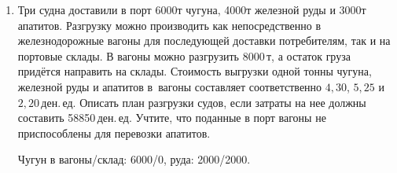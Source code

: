 \documentclass[a5paper,11pt]{extarticle}
\begin{document}
\begin{enumerate}
Найти количество сырья, которое следует переработать по каждой технологии, чтобы произвести 574~изделия~$A$ и~328~изделий~$B$ из 94\;ед. сырья.

{\raggedleft
\underline{$
(x_1,x_2,x_3,x_4) = (-\frac{12}{13} a, 14 + \frac{7}{26}a, 80 - \frac{9}{26} a, a)
$}

$
	\left\lbrace
	\begin{aligned}
		x_1 + x_2 + x_3 + x_4 &= 94,\\
		2x_1 + x_2 + 7x_3 + 4x_4 &= 574,\\
		6x_1 +12x_2 +2x_3 + 3x_4 &= 328.\\
	\end{aligned}
	\right.
$
\par}

\item 
	Три судна доставили в порт 6000\;т чугуна, 4000\;т железной руды и 3000\;т апатитов. Разгрузку можно производить как непосредственно в железнодорожные вагоны для последующей доставки потребителям, так и на портовые склады. В вагоны можно разгрузить 8000\,т, а остаток груза придётся направить на склады.  Стоимость выгрузки одной тонны чугуна, железной руды и апатитов в~вагоны составляет соответственно $4{,}30$, $5{,}25$ и $2{,}20$\,ден.\,ед.
Описать план разгрузки судов, если затраты на нее должны составить 58850\,ден.\,ед. Учтите, что поданные в порт вагоны не приспособлены для перевозки апатитов.

{\raggedleft
Чугун в вагоны/склад: 6000/0, руда: 2000/2000.\par
}
\end{enumerate}
\newpage
\end{document}
